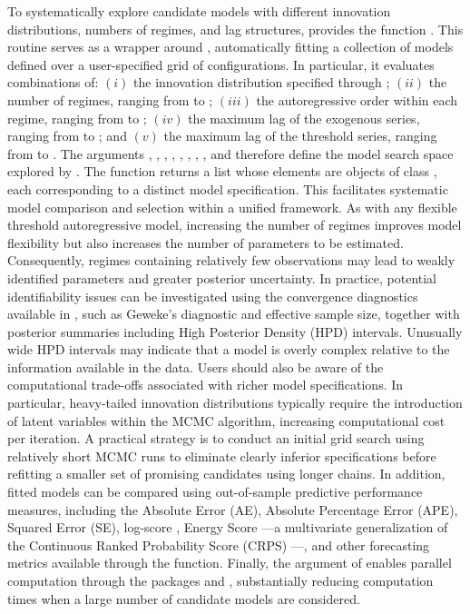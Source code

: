 To systematically explore candidate models with different innovation distributions, numbers of regimes, and lag structures,  provides the function . This routine serves as a wrapper around , automatically fitting a collection of models defined over a user-specified grid of configurations. In particular, it evaluates combinations of: $(i)$ the innovation distribution specified through ; $(ii)$ the number of regimes, ranging from  to ; $(iii)$ the autoregressive order within each regime, ranging from  to ; $(iv)$ the maximum lag of the exogenous series, ranging from  to ; and $(v)$ the maximum lag of the threshold series, ranging from  to . The arguments , , , , , , , , and  therefore define the model search space explored by . The function returns a list whose elements are objects of class , each corresponding to a distinct model specification. This facilitates systematic model comparison and selection within a unified framework. As with any flexible threshold autoregressive model, increasing the number of regimes improves model flexibility but also increases the number of parameters to be estimated. Consequently, regimes containing relatively few observations may lead to weakly identified parameters and greater posterior uncertainty. In practice, potential identifiability issues can be investigated using the convergence diagnostics available in , such as Geweke's diagnostic and effective sample size, together with posterior summaries including High Posterior Density (HPD) intervals. Unusually wide HPD intervals may indicate that a model is overly complex relative to the information available in the data. Users should also be aware of the computational trade-offs associated with richer model specifications. In particular, heavy-tailed innovation distributions typically require the introduction of latent variables within the MCMC algorithm, increasing computational cost per iteration. A practical strategy is to conduct an initial grid search using relatively short MCMC runs to eliminate clearly inferior specifications before refitting a smaller set of promising candidates using longer chains.
In addition, fitted models can be compared using out-of-sample predictive performance measures, including the Absolute Error (AE), Absolute Percentage Error (APE), Squared Error (SE), log-score \citep{Good1952}, Energy Score \citep{GneitingEtAl2008TEST}—a multivariate generalization of the Continuous Ranked Probability Score (CRPS) \citep{MathesonWinkler1976,GrimitGneitingBerrocalJohnson2006}—, and other forecasting metrics available through the  function. Finally, the  argument of  enables parallel computation through the packages  \citep{future} and  \citep{future.apply}, substantially reducing computation times when a large number of candidate models are considered.

